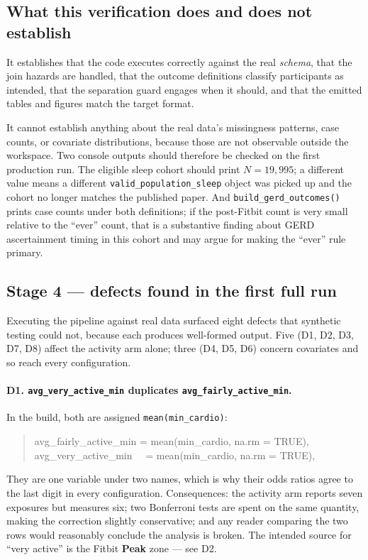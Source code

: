 \documentclass[11pt]{article}
\newcommand{\code}[1]{\texttt{\small #1}}
\begin{document}
\subsection{What this verification does and does not establish}
It establishes that the code executes correctly against the real \emph{schema}, that the join hazards
are handled, that the outcome definitions classify participants as intended, that the separation guard
engages when it should, and that the emitted tables and figures match the target format.

It cannot establish anything about the real data's missingness patterns, case counts, or covariate
distributions, because those are not observable outside the workspace. Two console outputs should
therefore be checked on the first production run. The eligible sleep cohort should print
$N = 19{,}995$; a different value means a different \code{valid_population_sleep} object was picked up
and the cohort no longer matches the published paper. And \code{build_gerd_outcomes()} prints case
counts under both definitions; if the post-Fitbit count is very small relative to the ``ever'' count,
that is a substantive finding about GERD ascertainment timing in this cohort and may argue for making
the ``ever'' rule primary.

\subsection{Stage 4 --- defects found in the first full run}
\label{sec:defects-run}
Executing the pipeline against real data surfaced eight defects that synthetic testing could not,
because each produces well-formed output. Five (D1, D2, D3, D7, D8) affect the activity arm alone;
three (D4, D5, D6) concern covariates and so reach every configuration.

\paragraph{D1. \code{avg_very_active_min} duplicates \code{avg_fairly_active_min}.}
In the build, both are assigned \code{mean(min_cardio)}:
\begin{quote}\ttfamily\footnotesize
avg\_fairly\_active\_min = mean(min\_cardio, na.rm = TRUE),\\
avg\_very\_active\_min~~ = mean(min\_cardio, na.rm = TRUE),
\end{quote}
They are one variable under two names, which is why their odds ratios agree to the last digit in
every configuration. Consequences: the activity arm reports seven exposures but measures six; two
Bonferroni tests are spent on the same quantity, making the correction slightly conservative; and
any reader comparing the two rows would reasonably conclude the analysis is broken. The intended
source for ``very active'' is the Fitbit \textbf{Peak} zone --- see D2.
\end{document}
